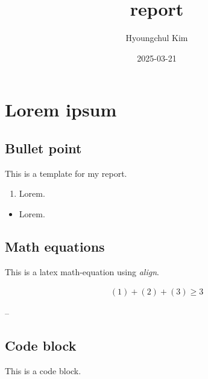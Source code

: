 \documentclass[
  letterpaper,
  DIV=11,
  numbers=noendperiod]{scrartcl}
\title{report}
\author{Hyoungchul Kim}
\date{2025-03-21}
\providecommand{\tightlist}{%
  \setlength{\itemsep}{0pt}\setlength{\parskip}{0pt}}\usepackage{longtable,booktabs,array}
\begin{document}
\maketitle


\section{Lorem ipsum}\label{lorem-ipsum}

\subsection{Bullet point}\label{bullet-point}

This is a template for my report.

\begin{enumerate}
\def\labelenumi{\arabic{enumi}.}
\tightlist
\item
  Lorem.
\end{enumerate}

\begin{itemize}
\tightlist
\item
  Lorem.
\end{itemize}

\subsection{Math equations}\label{math-equations}

This is a latex math-equation using \emph{align}.

\begin{align*}
  (1) + (2) + (3) \geq 3
\end{align*}

--

\subsection{Code block}\label{code-block}

This is a code block.
\end{document}
